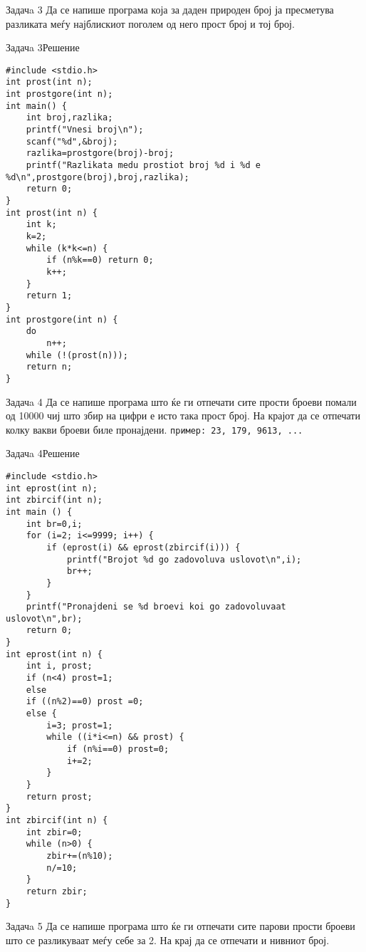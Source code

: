 \begin{frame}{Задачa 3}
Да се напише програма која за даден природен број ја пресметува разликата меѓу најблискиот поголем од него прост број и тој број.
\end{frame}

\begin{frame}[fragile]{Задачa 3}{Решение}
\begin{lstlisting}
#include <stdio.h>
int prost(int n);
int prostgore(int n);
int main() {
    int broj,razlika;
    printf("Vnesi broj\n");
    scanf("%d",&broj);
    razlika=prostgore(broj)-broj;
    printf("Razlikata medu prostiot broj %d i %d e %d\n",prostgore(broj),broj,razlika);
    return 0;
}
int prost(int n) {
    int k;
    k=2;
    while (k*k<=n) {
        if (n%k==0) return 0;
        k++;
    }
    return 1;
}
int prostgore(int n) {
    do
        n++;
    while (!(prost(n)));
    return n;
}
\end{lstlisting}
\end{frame}

\begin{frame}{Задачa 4}
Да се напише програма што ќе ги отпечати сите прости броеви помали од 10000 чиј што збир на цифри е исто така прост број. 
На крајот да се отпечати колку вакви броеви биле пронајдени. 
\texttt{пример: 23, 179, 9613, ...}\\
\end{frame}


\begin{frame}[fragile,shrink=10]{Задачa 4}{Решение}
\begin{lstlisting}
#include <stdio.h>
int eprost(int n);
int zbircif(int n);
int main () {
    int br=0,i;
    for (i=2; i<=9999; i++) {
        if (eprost(i) && eprost(zbircif(i))) {
            printf("Brojot %d go zadovoluva uslovot\n",i);
            br++;
        }
    }
    printf("Pronajdeni se %d broevi koi go zadovoluvaat uslovot\n",br);
    return 0;
}
int eprost(int n) {
    int i, prost;
    if (n<4) prost=1;
    else
    if ((n%2)==0) prost =0;
    else {
        i=3; prost=1;
        while ((i*i<=n) && prost) {
            if (n%i==0) prost=0;
            i+=2;
        }
    }
    return prost;
}
int zbircif(int n) {
    int zbir=0;
    while (n>0) {
        zbir+=(n%10);
        n/=10;
    }
    return zbir;
}
\end{lstlisting}
\end{frame}


\begin{frame}{Задачa 5}
Да се напише програма што ќе ги отпечати сите парови прости броеви што се разликуваат меѓу себе за 2. 
На крај да се отпечати и нивниот број.
\end{frame}


